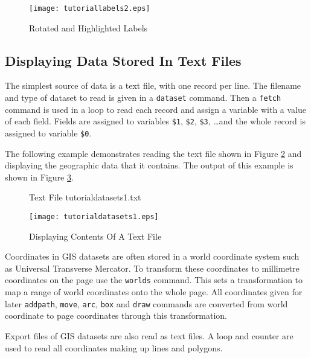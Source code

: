 

\begin{figure}[htb]
\texttt{[image: tutoriallabels2.eps]}
\caption{Rotated and Highlighted Labels}
\label{tutoriallabels2}
\end{figure}

\subsection{Displaying Data Stored In Text Files}

The simplest source of data is a text file, with one record per line.  The
filename and type of dataset to read is given in a \texttt{dataset} command.
Then a \texttt{fetch} command is used in a loop to read each record
and assign a variable with a value of each field.
Fields are assigned to variables
\texttt{\$1}, \texttt{\$2}, \texttt{\$3}, \dots and the whole record is
assigned to variable \texttt{\$0}.

The following example demonstrates reading the text file shown in Figure
\ref{tutorialdatasets1txt} and displaying the
geographic data that it contains.  The output of this example is shown in
Figure \ref{tutorialdatasets1}.

\begin{figure}[htb]

\caption{Text File tutorialdatasets1.txt}
\label{tutorialdatasets1txt}
\end{figure}



\begin{figure}[htb]
\texttt{[image: tutorialdatasets1.eps]}
\caption{Displaying Contents Of A Text File}
\label{tutorialdatasets1}
\end{figure}

Coordinates in GIS datasets are often stored
in a world coordinate system such as
Universal Transverse Mercator.  To transform these coordinates to millimetre
coordinates on the page use the \texttt{worlds} command.  This sets a
transformation to map a range of world coordinates onto the whole page.  All
coordinates given for later \texttt{addpath}, \texttt{move}, \texttt{arc},
\texttt{box} and
\texttt{draw} commands are converted from world coordinate to page coordinates
through this transformation.

Export files of GIS datasets are also read as text files.  A loop and counter
are used to read all coordinates making up lines and polygons.

